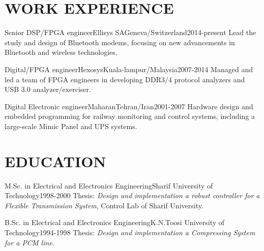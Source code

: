 \documentclass[10pt, a4paper]{article}
\begin{document}
\section{WORK EXPERIENCE}
\begin{cvitem}{Senior DSP/FPGA engineer}{Ellisys SA}{Geneva/Switzerland}{2014-present}
   Lead the study and design of Bluetooth modems, focusing on new advancements in Bluetooth and wireless technologies.
\end{cvitem}
\begin{cvitem}{Digital/FPGA engineer}{Hexosys}{Kuala-lampur/Malaysia}{2007-2014}
   Managed and led a team of FPGA engineers in developing DDR3/4 protocol analyzers and USB 3.0 analyzer/exerciser.
\end{cvitem}
\begin{cvitem}{Digital Electronic engineer}{Maharan}{Tehran/Iran}{2001-2007}
   Hardware design and embedded programming for railway monitoring and control systems, including a large-scale Mimic Panel and UPS systems.
\end{cvitem}
\section{EDUCATION}
\begin{cvitem}{M.Sc. in }{Electrical and Electronics Engineering}{Sharif University of Technology}{1998-2000}
    Thesis: \textit{Design and implementation a robust controller for a Flexible Transmission System}, Control Lab of Sharif University.
\end{cvitem}
\begin{cvitem}{B.Sc. in }{Electrical and Electronics Engineering}{K.N.Toosi University of Technology}{1994-1998}
    Thesis: \textit{Design and implementation a Compressing System for a PCM line}.
\end{cvitem}

%
%
\end{document}
